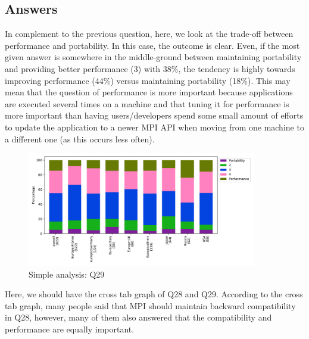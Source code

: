 
\subsection{Answers}


In complement to the previous question, here, we look at the trade-off between
performance and portability. In this case, the outcome is clear. Even, if the
most given answer is somewhere in the middle-ground between maintaining
portability and providing better performance (3) with 38\%, the tendency is
highly towards improving performance (44\%) versus maintaining portability
(18\%). This may mean that the question of performance is more important because
applications are executed several times on a machine and that tuning it for
performance is more important than having users/developers spend some small
amount of efforts to update the application to a newer MPI API when moving from
one machine to a different one (as this occurs less often).  

\begin{figure}[htb]
\begin{center}
\includegraphics[width=10cm]{../pdfs/Q29.pdf}
\caption{Simple analysis: Q29}
\label{fig:Q29}
\end{center}
\end{figure}

Here, we should have the cross tab graph of Q28 and Q29. According to
the cross tab graph, many people said that MPI should maintain
backward compatibility in Q28, however, many of them also answered
that the compatibility and performance are equally important.
